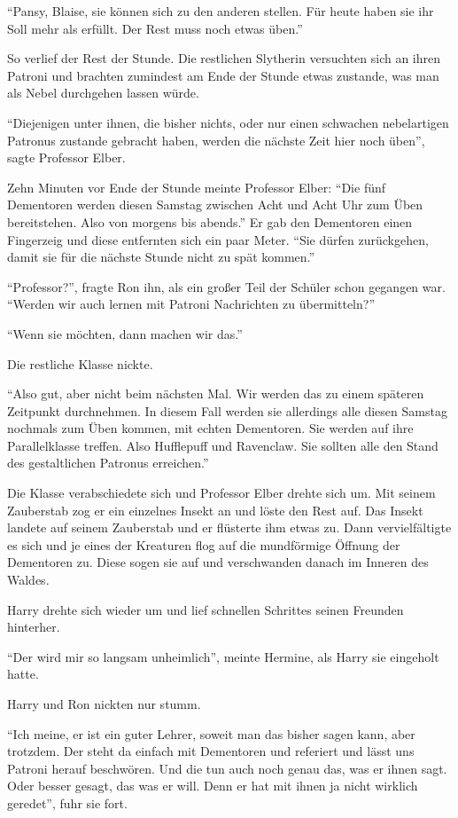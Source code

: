 \enquote{Pansy, Blaise, sie können sich zu den anderen stellen. Für heute haben sie ihr Soll mehr als erfüllt. Der Rest muss noch etwas üben.}

So verlief der Rest der Stunde. Die restlichen Slytherin versuchten sich an ihren Patroni und brachten zumindest am Ende der Stunde etwas zustande, was man als Nebel durchgehen lassen würde.

\enquote{Diejenigen unter ihnen, die bisher nichts, oder nur einen schwachen nebelartigen Patronus zustande gebracht haben, werden die nächste Zeit hier noch üben}, sagte Professor Elber.

Zehn Minuten vor Ende der Stunde meinte Professor Elber: \enquote{Die fünf Dementoren werden diesen Samstag zwischen Acht und Acht Uhr zum Üben bereitstehen. Also von morgens bis abends.} Er gab den Dementoren einen Fingerzeig und diese entfernten sich ein paar Meter. \enquote{Sie dürfen zurückgehen, damit sie für die nächste Stunde nicht zu spät kommen.}

\enquote{Professor?}, fragte Ron ihn, als ein großer Teil der Schüler schon gegangen war. \enquote{Werden wir auch lernen mit Patroni Nachrichten zu übermitteln?}

\enquote{Wenn sie möchten, dann machen wir das.}

Die restliche Klasse nickte.

\enquote{Also gut, aber nicht beim nächsten Mal. Wir werden das zu einem späteren Zeitpunkt durchnehmen. In diesem Fall werden sie allerdings alle diesen Samstag nochmals zum Üben kommen, mit echten Dementoren. Sie werden auf ihre Parallelklasse treffen. Also Hufflepuff und Ravenclaw. Sie sollten alle den Stand des gestaltlichen Patronus erreichen.}

Die Klasse verabschiedete sich und Professor Elber drehte sich um. Mit seinem Zauberstab zog er ein einzelnes Insekt an und löste den Rest auf. Das Insekt landete auf seinem Zauberstab und er flüsterte ihm etwas zu. Dann vervielfältigte es sich und je eines der Kreaturen flog auf die mundförmige Öffnung der Dementoren zu. Diese sogen sie auf und verschwanden danach im Inneren des Waldes.

Harry drehte sich wieder um und lief schnellen Schrittes seinen Freunden hinterher.

\enquote{Der wird mir so langsam unheimlich}, meinte Hermine, als Harry sie eingeholt hatte.

Harry und Ron nickten nur stumm.

\enquote{Ich meine, er ist ein guter Lehrer, soweit man das bisher sagen kann, aber trotzdem. Der steht da einfach mit Dementoren und referiert und lässt uns Patroni herauf beschwören. Und die tun auch noch genau das, was er ihnen sagt. Oder besser gesagt, das was er will. Denn er hat mit ihnen ja nicht wirklich geredet}, fuhr sie fort.

